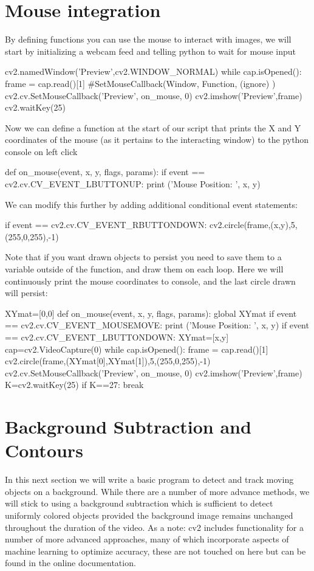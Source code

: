 \documentclass[a4paper,12pt]{article}
\begin{document}
\newpage
\section{Mouse integration}
By defining functions you can use the mouse to interact with images, we will start by initializing a webcam feed and telling python to wait for mouse input
\begin{python}
cv2.namedWindow('Preview',cv2.WINDOW_NORMAL)
while cap.isOpened():
	frame = cap.read()[1]
	#SetMouseCallback(Window, Function, (ignore) )
	cv2.cv.SetMouseCallback('Preview', on_mouse, 0) 
	cv2.imshow('Preview',frame)
	cv2.waitKey(25)
\end{python}
Now we can define a function at the start of our script that prints the X and Y coordinates of the mouse (as it pertains to the interacting window) to the python console on left click
\begin{python}
def on_mouse(event, x, y, flags, params):
	if event == cv2.cv.CV_EVENT_LBUTTONUP:
		print ('Mouse Position: ', x, y)
\end{python}
We can modify this further by adding additional conditional event statements:
\begin{python}
if event == cv2.cv.CV_EVENT_RBUTTONDOWN:
	cv2.circle(frame,(x,y),5,(255,0,255),-1)
\end{python}
Note that if you want drawn objects to persist you need to save them to a variable outside of the function, and draw them on each loop. Here we will continuously print the mouse coordinates to console, and the last circle drawn will persist:
\begin{python}
XYmat=[0,0]
def on_mouse(event, x, y, flags, params):
	global XYmat
	if event == cv2.cv.CV_EVENT_MOUSEMOVE:
		print ('Mouse Position: ', x, y)
	if event == cv2.cv.CV_EVENT_LBUTTONDOWN:
		XYmat=[x,y]
cap=cv2.VideoCapture(0)
while cap.isOpened():
	frame = cap.read()[1]
	cv2.circle(frame,(XYmat[0],XYmat[1]),5,(255,0,255),-1)
	cv2.cv.SetMouseCallback('Preview', on_mouse, 0) 
	cv2.imshow('Preview',frame)
	K=cv2.waitKey(25)
	if K==27:
		break
\end{python}
\newpage
\section{Background Subtraction and Contours}
In this next section we will write a basic program to detect and track moving objects on a background. While there are a number of more advance methods, we will stick to using a background subtraction which is sufficient to detect uniformly colored objects provided the background image remains unchanged throughout the duration of the video. As a note: cv2 includes functionality for a number of more advanced approaches, many of which incorporate aspects of machine learning to optimize accuracy, these are not touched on here but can be found in the online documentation.
\end{document}
